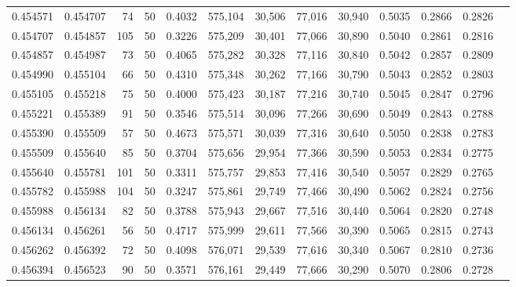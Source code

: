\begin{tabular}{rrrrrrrrrrrrr}
0.454571 & 0.454707 &    74 &  50 &                                     0.4032 & 575,104 &  30,506 &  77,016 &  30,940 & 0.5035 & 0.2866 & 0.2826 \\
0.454707 & 0.454857 &   105 &  50 &                                     0.3226 & 575,209 &  30,401 &  77,066 &  30,890 & 0.5040 & 0.2861 & 0.2816 \\
0.454857 & 0.454987 &    73 &  50 &                                     0.4065 & 575,282 &  30,328 &  77,116 &  30,840 & 0.5042 & 0.2857 & 0.2809 \\
0.454990 & 0.455104 &    66 &  50 &                                     0.4310 & 575,348 &  30,262 &  77,166 &  30,790 & 0.5043 & 0.2852 & 0.2803 \\
0.455105 & 0.455218 &    75 &  50 &                                     0.4000 & 575,423 &  30,187 &  77,216 &  30,740 & 0.5045 & 0.2847 & 0.2796 \\
0.455221 & 0.455389 &    91 &  50 &                                     0.3546 & 575,514 &  30,096 &  77,266 &  30,690 & 0.5049 & 0.2843 & 0.2788 \\
0.455390 & 0.455509 &    57 &  50 &                                     0.4673 & 575,571 &  30,039 &  77,316 &  30,640 & 0.5050 & 0.2838 & 0.2783 \\
0.455509 & 0.455640 &    85 &  50 &                                     0.3704 & 575,656 &  29,954 &  77,366 &  30,590 & 0.5053 & 0.2834 & 0.2775 \\
0.455640 & 0.455781 &   101 &  50 &                                     0.3311 & 575,757 &  29,853 &  77,416 &  30,540 & 0.5057 & 0.2829 & 0.2765 \\
0.455782 & 0.455988 &   104 &  50 &                                     0.3247 & 575,861 &  29,749 &  77,466 &  30,490 & 0.5062 & 0.2824 & 0.2756 \\
0.455988 & 0.456134 &    82 &  50 &                                     0.3788 & 575,943 &  29,667 &  77,516 &  30,440 & 0.5064 & 0.2820 & 0.2748 \\
0.456134 & 0.456261 &    56 &  50 &                                     0.4717 & 575,999 &  29,611 &  77,566 &  30,390 & 0.5065 & 0.2815 & 0.2743 \\
0.456262 & 0.456392 &    72 &  50 &                                     0.4098 & 576,071 &  29,539 &  77,616 &  30,340 & 0.5067 & 0.2810 & 0.2736 \\
0.456394 & 0.456523 &    90 &  50 &                                     0.3571 & 576,161 &  29,449 &  77,666 &  30,290 & 0.5070 & 0.2806 & 0.2728 \\

\end{tabular}

